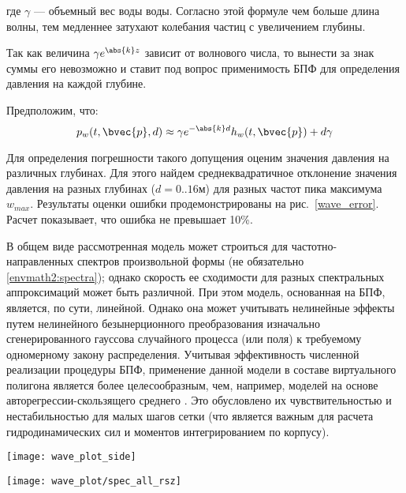 где $\gamma$ --- объемный вес воды воды. Согласно этой формуле чем больше длина волны, тем медленнее затухают колебания частиц с увеличением глубины.

Так как величина $\gamma e^{\abs{k}z}$ зависит от волнового числа, то вынести за знак суммы его невозможно и ставит под вопрос применимость БПФ для определения давления на каждой глубине.

Предположим, что:
\begin{equation}
\label{wave_height}
	p_w(t,\bvec{p},d) \approx
		\gamma e^{-\abs{k}d} h_w(t,\bvec{p}) + d \gamma
\end{equation}

Для определения погрешности такого допущения оценим значения давления на различных глубинах.
Для этого найдем среднеквадратичное отклонение значения давления на разных глубинах ($d=0..16 \text{м}$) для разных частот пика максимума $w_{max}$. Результаты оценки ошибки продемонстрированы на рис.~\ref{wave_error}. Расчет показывает, что ошибка не превышает 10\%. 

В общем виде рассмотренная модель может строиться для частотно-направленных спектров произвольной формы (не обязательно \eqref{envmath2:spectra}); однако скорость ее сходимости для разных спектральных аппроксимаций может быть различной. При этом модель, основанная на БПФ, является, по сути, линейной. Однако она может учитывать нелинейные эффекты путем нелинейного безынерционного преобразования изначально сгенерированного гауссова случайного процесса (или поля) к требуемому одномерному закону распределения. Учитывая эффективность численной реализации процедуры БПФ, применение данной модели в составе виртуального полигона является более целесообразным, чем, например, моделей на основе авторегрессии-скользящего среднего \citep{dk8}. Это обусловлено их чувствительностью и нестабильностью для малых шагов сетки (что является важным для расчета гидродинамических сил и моментов интегрированием по корпусу). 

\begin{sidewaysfigure}
	\texttt{[image: wave\_plot\_side]}
	\caption{Оценка ошибки расчета давления приближенным способом: (a) --- профиль поверхностей равного давления при точном расчете; (б) --- профиль поверхностей равного давления при приближенном расчете; (в) --- стандартное отклонение ошибки расчета давления на разных глубинах, для разных частот пика максимума; (г) --- относительная ошибка расчета давления на разных глубинах, для разных частот пика максимума.}
	\label{wave_error}
\end{sidewaysfigure}



\begin{sidewaysfigure}
\begin{center}
	\texttt{[image: wave\_plot/spec\_all\_rsz]}
\end{center}
\caption{Планшеты ядра БПФ и карт высот морского волнения для различных значение параметра формы углового распределения}
\label{waveplot}
\end{sidewaysfigure}

